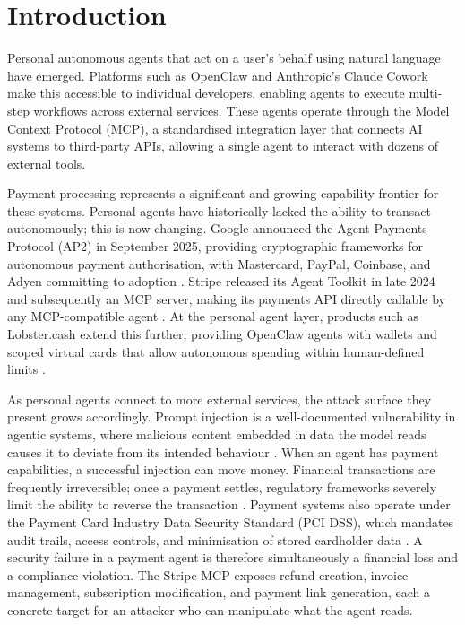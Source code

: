 \documentclass[conference]{IEEEtran}
\begin{document}
\section{Introduction}

Personal autonomous agents that act on a user's behalf using natural language have emerged.
Platforms such as OpenClaw and Anthropic's Claude Cowork make this accessible to individual
developers, enabling agents to execute multi-step workflows across external services.
These agents operate through the Model Context Protocol (MCP), a standardised integration
layer that connects AI systems to third-party APIs, allowing a single agent to interact
with dozens of external tools.

Payment processing represents a significant and growing capability frontier for these systems.
Personal agents have historically lacked the ability to transact autonomously; this is now
changing. Google announced the Agent Payments Protocol (AP2) in September 2025, providing
cryptographic frameworks for autonomous payment authorisation, with Mastercard, PayPal,
Coinbase, and Adyen committing to adoption \cite{google_ap2_2025}. Stripe released its
Agent Toolkit in late 2024 and subsequently an MCP server, making its payments API directly
callable by any MCP-compatible agent \cite{stripe_mcp_2025}. At the personal agent layer,
products such as Lobster.cash extend this further, providing OpenClaw agents with wallets
and scoped virtual cards that allow autonomous spending within human-defined limits
\cite{lobster_cash_2026}.

As personal agents connect to more external services, the attack surface they present grows
accordingly. Prompt injection is a well-documented vulnerability in agentic systems, where
malicious content embedded in data the model reads causes it to deviate from its intended
behaviour \cite{greshake2023indirect}. When an agent has payment capabilities, a
successful injection can move money. Financial transactions are frequently irreversible;
once a payment settles, regulatory frameworks severely limit the ability to reverse the
transaction \cite{payment_irreversibility}. Payment systems also operate under the Payment Card Industry
Data Security Standard (PCI DSS), which mandates audit trails, access controls, and
minimisation of stored cardholder data \cite{pci_dss}. A security failure in a payment agent is therefore
simultaneously a financial loss and a compliance violation. The Stripe MCP exposes refund
creation, invoice management, subscription modification, and payment link generation, each
a concrete target for an attacker who can manipulate what the agent reads.
\end{document}
